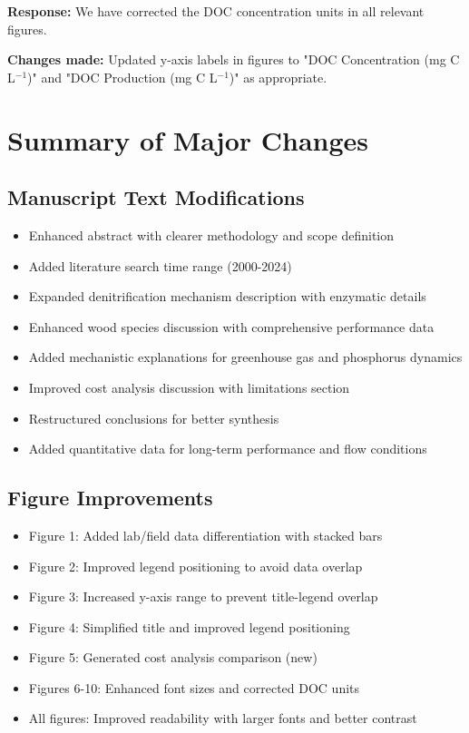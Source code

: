 \documentclass[12pt,a4paper]{article}
\begin{document}
\textbf{Response:} We have corrected the DOC concentration units in all relevant figures.

\textbf{Changes made:} Updated y-axis labels in figures to "DOC Concentration (mg C L$^{-1}$)" and "DOC Production (mg C L$^{-1}$)" as appropriate.

\section{Summary of Major Changes}

\subsection{Manuscript Text Modifications}
\begin{itemize}
\item Enhanced abstract with clearer methodology and scope definition
\item Added literature search time range (2000-2024)
\item Expanded denitrification mechanism description with enzymatic details
\item Enhanced wood species discussion with comprehensive performance data
\item Added mechanistic explanations for greenhouse gas and phosphorus dynamics
\item Improved cost analysis discussion with limitations section
\item Restructured conclusions for better synthesis
\item Added quantitative data for long-term performance and flow conditions
\end{itemize}

\subsection{Figure Improvements}
\begin{itemize}
\item Figure 1: Added lab/field data differentiation with stacked bars
\item Figure 2: Improved legend positioning to avoid data overlap
\item Figure 3: Increased y-axis range to prevent title-legend overlap
\item Figure 4: Simplified title and improved legend positioning
\item Figure 5: Generated cost analysis comparison (new)
\item Figures 6-10: Enhanced font sizes and corrected DOC units
\item All figures: Improved readability with larger fonts and better contrast
\end{itemize}
\end{document}
